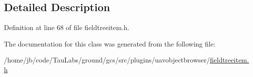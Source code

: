 \subsection{\-Detailed \-Description}


\-Definition at line 68 of file fieldtreeitem.\-h.



\-The documentation for this class was generated from the following file\-:\begin{DoxyCompactItemize}
\item 
/home/jb/code/\-Tau\-Labs/ground/gcs/src/plugins/uavobjectbrowser/\hyperlink{fieldtreeitem_8h}{fieldtreeitem.\-h}\end{DoxyCompactItemize}
